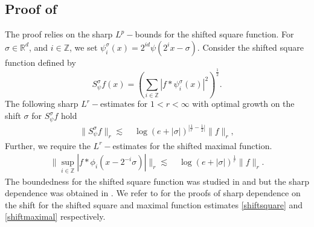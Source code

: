 \documentclass[a4paper,reqno]{amsart}
\newcommand{\R}{{\mathbb R}}       %
\newcommand{\Z}{{\mathbb Z}}
\theoremstyle{definition}
\numberwithin{equation}{section}
\begin{document}
\subsection{Proof of }
The proof relies on the sharp $L^p-$bounds for the shifted square function. For $\sigma\in\R^d$, and $i\in\Z$, we set $\psi_i^\sigma(x)=2^{id}\psi(2^ix-\sigma)$. Consider the shifted square function defined by 
\begin{equation*}
		S_{\psi}^{\sigma}f(x)=\left(\sum_{i\in\Z}|f*\psi_i^\sigma(x)|^2\right)^\frac{1}{2}.
	\end{equation*}
	The following sharp $L^r-$estimates for $1<r<\infty$ with optimal growth on the shift $\sigma$ for $S_{\psi}^{\sigma}f$ hold
	\begin{align}
		\|S_{\psi}^{\sigma}f\|_r\lesssim&\;\log(e+|\sigma|)^{\left|\frac{1}{r}-\frac{1}{2}\right|}\|f\|_r,\label{shiftsquare}
	\end{align}
	Further, we require the $L^r-$estimates for the shifted maximal function. 
\begin{align}
	\|\sup\limits_{i\in\Z}|f*\phi_i(x-2^{-i}\sigma)|\|_r\lesssim&\;\log(e+|\sigma|)^\frac{1}{r}\|f\|_r.\label{shiftmaximal}
\end{align}
The boundedness for the shifted square function was studied in \cite{Muscalu} and \cite{SteinHarmonicAnalysisRealVariableMethodOrtho} but the sharp dependence was obtained in \cite{Park2024}.
We refer to \cite[Theorems 1.6 and 1.3]{Park2024} for the proofs of sharp dependence on the shift for the shifted square and maximal function estimates \eqref{shiftsquare} and \eqref{shiftmaximal} respectively. 
\end{document}
